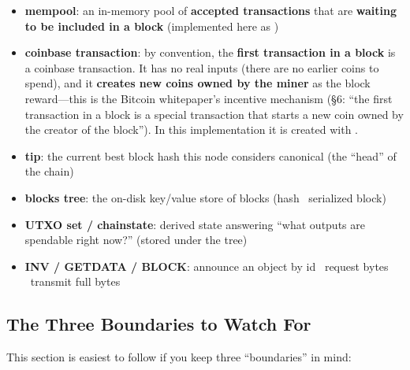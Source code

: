 \begin{itemize}
  \item \textbf{mempool}: an in-memory pool of \textbf{accepted transactions} that are \textbf{waiting to be included in a block} (implemented here as )
  \item \textbf{coinbase transaction}: by convention, the \textbf{first transaction in a block} is a coinbase transaction. It has no real inputs (there are no earlier coins to spend), and it \textbf{creates new coins owned by the miner} as the block reward---this is the Bitcoin whitepaper's incentive mechanism (\S6: ``the first transaction in a block is a special transaction that starts a new coin owned by the creator of the block''). In this implementation it is created with .
  \item \textbf{tip}: the current best block hash this node considers canonical (the ``head'' of the chain)
  \item \textbf{blocks tree}: the on-disk key/value store of blocks (hash \textrightarrow\ serialized block)
  \item \textbf{UTXO set / chainstate}: derived state answering ``what outputs are spendable right now?'' (stored under the  tree)
  \item \textbf{INV / GETDATA / BLOCK}: announce an object by id \textrightarrow\ request bytes \textrightarrow\ transmit full bytes
\end{itemize}

\subsection{The Three Boundaries to Watch For}
\label{sec:ch09-6-boundaries}

This section is easiest to follow if you keep three ``boundaries'' in mind:

